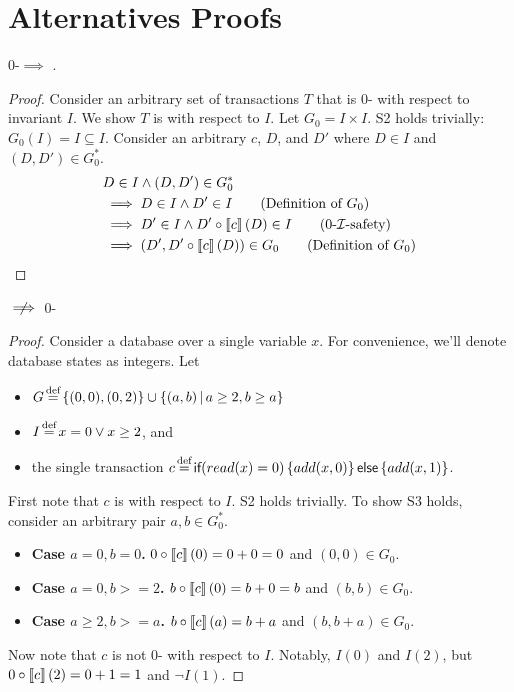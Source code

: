 \section{\iconfluence{} Alternatives Proofs}\label{app:alternativesproofs}
\begin{claim}\label{clm:0-isafety-implies-istrengthstar}
  0-\isafety $\implies$ \istrengthstar.
\end{claim}
\begin{proof}
  Consider an arbitrary set of \imp{} transactions $T$ that is 0-\isafe{} with
  respect to invariant $I$. We show $T$ is \istrongstar{} with respect to $I$.
  Let $G_0 = I \times I$. S2 holds trivially: $G_0(I) = I
  \subseteq I$. Consider an arbitrary $c$, $D$, and $D'$ where $D \in I$ and
  $(D, D') \in G_0^*$.
  \begin{align*}
    & D \in I \land (D, D') \in G_0^*  \\
    &\implies D \in I \land D' \in I \tag{Definition of $G_0$} \\
    &\implies D' \in I \land D' \circ \denote{c}(D) \in I \tag{0-\isafety} \\
    &\implies (D', D' \circ \denote{c}(D)) \in G_0 \tag{Definition of $G_0$}
  \end{align*}
\end{proof}

\begin{claim}\label{clm:istrengthstar-not-implies-0-isafety}
  \istrengthstar $\centernot\implies$ 0-\isafety
\end{claim}
\begin{proof}
  Consider a database over a single variable $x$. For convenience, we'll denote
  database states as integers. Let
  \begin{itemize}
    \item
      $G \defeq \set{(0, 0), (0, 2)} \cup \setst{(a, b)}{a \geq 2, b \geq a}$
    \item
      $I \defeq x = 0 \lor x \geq 2$, and
    \item
      the single \imp{} transaction $c \defeq
      \impif{read(x)=0}{add(x, 0)}{add(x, 1)}$.
  \end{itemize}

  First note that $c$ is \istrengthstar{} with respect to $I$. S2 holds
  trivially. To show S3 holds, consider an arbitrary pair $a, b \in G_0^*$.
  \begin{itemize}
    \item \textbf{Case $a = 0, b = 0$.}
      $0 \circ \left\llbracket c\right\rrbracket(0) = 0 + 0 = 0$ and $(0, 0) \in G_0$.
    \item \textbf{Case $a = 0, b >= 2$.}
      $b \circ \left\llbracket c\right\rrbracket(0) = b + 0 = b$ and $(b, b) \in G_0$.
    \item \textbf{Case $a \geq 2, b >= a$.}
      $b \circ \left\llbracket c\right\rrbracket(a) = b + a$ and $(b, b + a) \in G_0$.
  \end{itemize}

  Now note that $c$ is not 0-\isafe{} with respect to $I$. Notably, $I(0)$ and
  $I(2)$, but $0 \circ \left\llbracket c\right\rrbracket(2) = 0 + 1 = 1$ and $\lnot I(1)$.
\end{proof}

